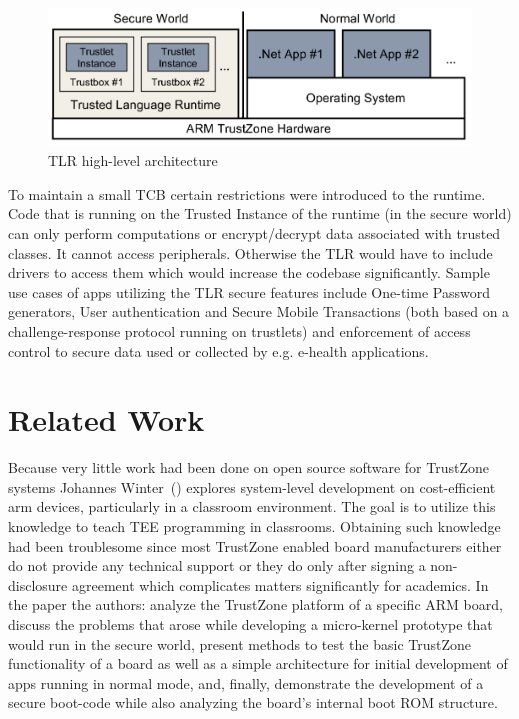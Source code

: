 \documentclass[cameraready]{cseminar}
\begin{document}
\begin{figure}[t]
  \begin{center}
    \includegraphics[width=.5\textwidth]{figures/netmf_arch}
    \caption{TLR high-level architecture\cite{trusted}}
    \label{fig:netmf_arch}
  \end{center}
\end{figure}

To maintain a small TCB certain restrictions were introduced to the runtime. Code that is running on the Trusted Instance of the runtime (in the secure world) can only perform computations or encrypt/decrypt data associated with trusted classes. It cannot access peripherals. Otherwise the TLR would have to include drivers to access them which would increase the codebase significantly. Sample use cases of apps utilizing the TLR secure features include One-time Password generators, User authentication and Secure Mobile Transactions (both based on a challenge-response protocol running on trustlets) and enforcement of access control to secure data used or collected by e.g. e-health applications.


\section{Related Work}
\label{relatedwork}

Because very little work had been done on open source software for TrustZone systems Johannes Winter~(\cite{experimenting}) explores system-level development on cost-efficient arm devices, particularly in a classroom environment. The goal is to utilize this knowledge to teach TEE programming in classrooms. Obtaining such knowledge had been troublesome since most TrustZone enabled board manufacturers either do not provide any technical support or they do only after signing a non-disclosure agreement which complicates matters significantly for academics. In the paper the authors: analyze the TrustZone platform of a specific ARM board, discuss the problems that arose while developing a micro-kernel prototype that would run in the secure world, present methods to test the basic TrustZone functionality of a board as well as a simple architecture for initial development of apps running in normal mode, and, finally, demonstrate the development of a secure boot-code while also analyzing the board's internal boot ROM structure.
\end{document}
